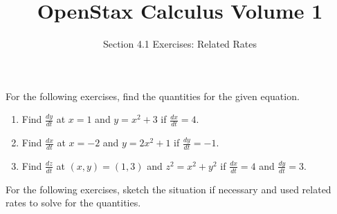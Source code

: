 \documentclass{exercises}
\title{OpenStax Calculus Volume 1}
\subtitle{Section 4.1 Exercises: Related Rates}
\author{}
\date{}
\begin{document}
\maketitle


For the following exercises, find the quantities for the given equation.

\begin{enumerate}[start=1]
\item Find $\frac{dy}{dt}$ at $x=1$ and $y=x^{2}+3$ if $\frac{dx}{dt}=4$.
\item Find $\frac{dx}{dt}$ at $x=-2$ and $y=2x^{2}+1$ if $\frac{dy}{dt}=-1$.
\item Find $\frac{dz}{dt}$ at $(x,y)=(1,3)$ and $z^{2}=x^{2}+y^{2}$ if $\frac{dx}{dt}=4$ and $\frac{dy}{dt}=3$.
\end{enumerate}

For the following exercises, sketch the situation if necessary and used related rates to solve for the quantities.
\end{document}
